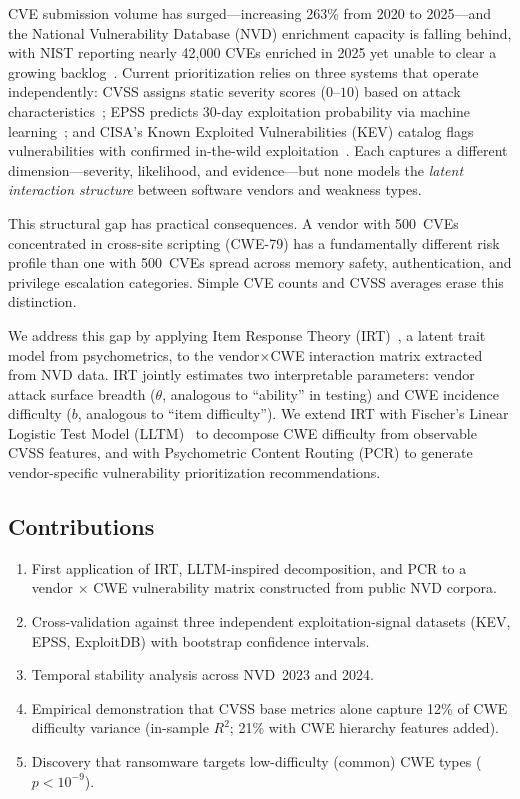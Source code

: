 \documentclass[11pt,a4paper]{article}
\begin{document}
CVE submission volume has surged---increasing 263\% from 2020 to 2025---and the National Vulnerability Database (NVD) enrichment capacity is falling behind, with NIST reporting nearly 42,000 CVEs enriched in 2025 yet unable to clear a growing backlog~\citep{nist2026}.
Current prioritization relies on three systems that operate independently: CVSS assigns static severity scores ($0$--$10$) based on attack characteristics~\citep{cvss31}; EPSS predicts 30-day exploitation probability via machine learning~\citep{jacobs2021epss}; and CISA's Known Exploited Vulnerabilities (KEV) catalog flags vulnerabilities with confirmed in-the-wild exploitation~\citep{bod2201}.
Each captures a different dimension---severity, likelihood, and evidence---but none models the \textit{latent interaction structure} between software vendors and weakness types.

This structural gap has practical consequences.
A vendor with 500~CVEs concentrated in cross-site scripting (CWE-79) has a fundamentally different risk profile than one with 500~CVEs spread across memory safety, authentication, and privilege escalation categories.
Simple CVE counts and CVSS averages erase this distinction.

We address this gap by applying Item Response Theory (IRT)~\citep{lord1968}, a latent trait model from psychometrics, to the vendor$\times$CWE interaction matrix extracted from NVD data.
IRT jointly estimates two interpretable parameters: vendor attack surface breadth ($\theta$, analogous to ``ability'' in testing) and CWE incidence difficulty ($b$, analogous to ``item difficulty'').
We extend IRT with Fischer's Linear Logistic Test Model (LLTM)~\citep{fischer1973} to decompose CWE difficulty from observable CVSS features, and with Psychometric Content Routing (PCR) to generate vendor-specific vulnerability prioritization recommendations.

\subsection{Contributions}

\begin{enumerate}
\item First application of IRT, LLTM-inspired decomposition, and PCR to a vendor $\times$ CWE vulnerability matrix constructed from public NVD corpora.
\item Cross-validation against three independent exploitation-signal datasets (KEV, EPSS, ExploitDB) with bootstrap confidence intervals.
\item Temporal stability analysis across NVD~2023 and 2024.
\item Empirical demonstration that CVSS base metrics alone capture 12\% of CWE difficulty variance (in-sample $R^2$; 21\% with CWE hierarchy features added).
\item Discovery that ransomware targets low-difficulty (common) CWE types ($p < 10^{-9}$).
\end{enumerate}
\end{document}
